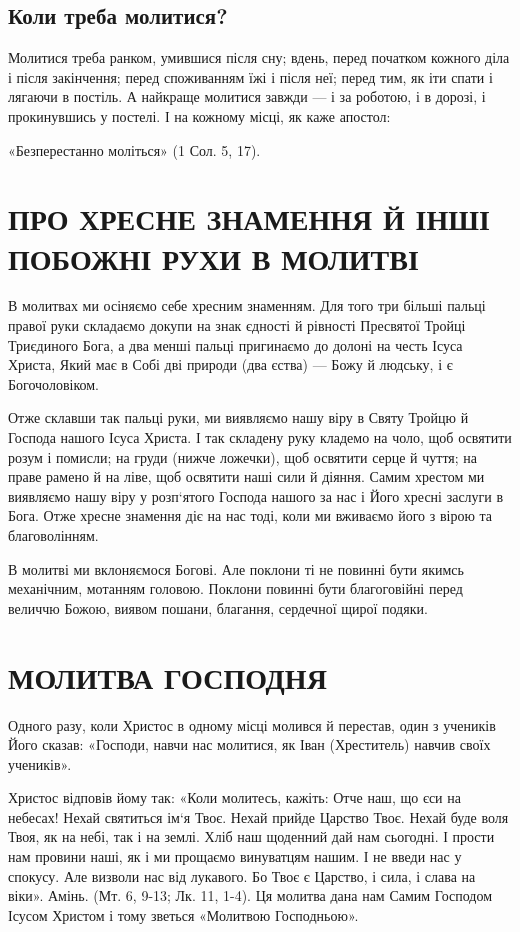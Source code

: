 \documentclass[main.tex]{subfiles}
\begin{document}
\subsection{Коли треба молитися?}

Молитися треба ранком, умившися після сну; вдень, перед початком кожного діла і після закінчення; перед споживанням їжі і після неї; перед тим, як іти спати і лягаючи в постіль. А найкраще молитися завжди — і за роботою, і в дорозі, і прокинувшись у постелі. І на кожному місці, як каже апостол:

«Безперестанно моліться» (1 Сол. 5, 17).

\section{ПРО ХРЕСНЕ ЗНАМЕННЯ Й ІНШІ ПОБОЖНІ РУХИ В МОЛИТВІ}

В молитвах ми осіняємо себе хресним знаменням. Для того три більші пальці правої руки складаємо докупи на знак єдності й рівності Пресвятої Тройці Триєдиного Бога, а два менші пальці пригинаємо до долоні на честь Ісуса Христа, Який має в Собі дві природи (два єства) — Божу й людську, і є Богочоловіком.

Отже склавши так пальці руки, ми виявляємо нашу віру в Святу Тройцю й Господа нашого Ісуса Христа. І так складену руку кладемо на чоло, щоб освятити розум і помисли; на груди (нижче ложечки), щоб освятити серце й чуття; на праве рамено й на ліве, щоб освятити наші сили й діяння. Самим хрестом ми виявляємо нашу віру у розп`ятого Господа нашого за нас і Його хресні заслуги в Бога. Отже хресне знамення діє на нас тоді, коли ми вживаємо його з вірою та благоволінням.

В молитві ми вклоняємося Богові. Але поклони ті не повинні бути якимсь механічним, мотанням головою. Поклони повинні бути благоговійні перед величчю Божою, виявом пошани, благання, сердечної щирої подяки.

\section{МОЛИТВА ГОСПОДНЯ}

Одного разу, коли Христос в одному місці молився й перестав, один з учеників Його сказав: «Господи, навчи нас молитися, як Іван (Хреститель) навчив своїх учеників».

Христос відповів йому так: «Коли молитесь, кажіть: Отче наш, що єси на небесах! Нехай святиться ім`я Твоє. Нехай прийде Царство Твоє. Нехай буде воля Твоя, як на небі, так і на землі. Хліб наш щоденний дай нам сьогодні. І прости нам провини наші, як і ми прощаємо винуватцям нашим. І не введи нас у спокусу. Але визволи нас від лукавого. Бо Твоє є Царство, і сила, і слава на віки». Амінь. (Мт. 6, 9-13; Лк. 11, 1-4). Ця молитва дана нам Самим Господом Ісусом Христом і тому зветься «Молитвою Господньою».
\end{document}
